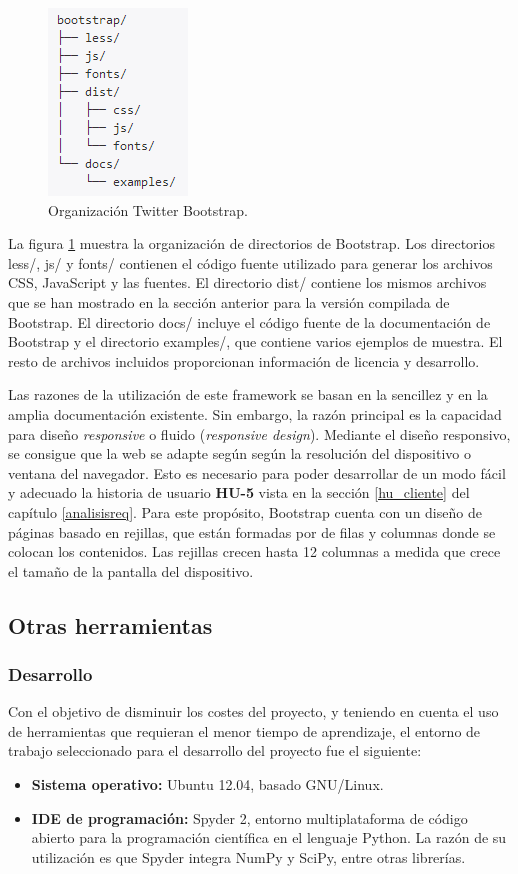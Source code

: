 \begin{figure}[H]
\centering
\includegraphics{figuras/bootstrap.png}
\caption{Organización Twitter Bootstrap.}
\label{fig:booststrap}
\end{figure}

La figura \ref{fig:booststrap} muestra la organización de directorios de Bootstrap. Los directorios less/, js/ y fonts/ contienen el código fuente utilizado para generar los archivos CSS, JavaScript y las fuentes. El directorio dist/ contiene los mismos archivos que se han mostrado en la sección anterior para la versión compilada de Bootstrap. El directorio docs/ incluye el código fuente de la documentación de Bootstrap y el directorio examples/, que contiene varios ejemplos de muestra. El resto de archivos incluidos proporcionan información de licencia y desarrollo.

Las razones de la utilización de este framework se basan en la sencillez y en la amplia documentación existente. Sin embargo, la razón principal es la capacidad para diseño \textit{responsive} o fluido (\textit{responsive design}). Mediante el diseño responsivo, se consigue que la web se adapte según según la resolución del dispositivo o ventana del navegador. Esto es necesario para poder desarrollar de un modo fácil y adecuado la historia de usuario \textbf{HU-5} vista en la sección \ref{hu_cliente} del capítulo \ref{analisisreq}. Para este propósito, Bootstrap cuenta con un diseño de páginas basado en rejillas, que están formadas por de filas y columnas donde se colocan los contenidos. Las rejillas crecen hasta 12 columnas a medida que crece el tamaño de la pantalla del dispositivo.

\subsection{Otras herramientas}
\subsubsection{\textbf{Desarrollo}}
Con el objetivo de disminuir los costes del proyecto, y teniendo en cuenta el uso de herramientas que requieran el menor tiempo de aprendizaje, el entorno de trabajo seleccionado para el desarrollo del proyecto fue el siguiente:
\begin{itemize}
\item \textbf{Sistema operativo:} Ubuntu 12.04, basado GNU/Linux.
\item \textbf{IDE de programación:} Spyder 2, entorno multiplataforma de código abierto para la programación científica en el lenguaje Python. La razón de su utilización es que Spyder integra NumPy y SciPy, entre otras librerías.
\end{itemize}
